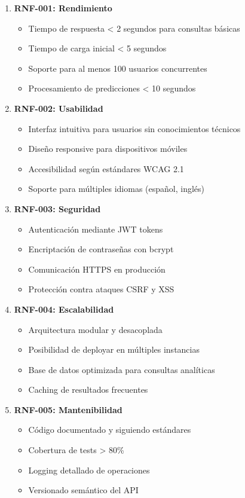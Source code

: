 \begin{enumerate}
    \item \textbf{RNF-001: Rendimiento}
    \begin{itemize}
        \item Tiempo de respuesta < 2 segundos para consultas básicas
        \item Tiempo de carga inicial < 5 segundos
        \item Soporte para al menos 100 usuarios concurrentes
        \item Procesamiento de predicciones < 10 segundos
    \end{itemize}
    
    \item \textbf{RNF-002: Usabilidad}
    \begin{itemize}
        \item Interfaz intuitiva para usuarios sin conocimientos técnicos
        \item Diseño responsive para dispositivos móviles
        \item Accesibilidad según estándares WCAG 2.1
        \item Soporte para múltiples idiomas (español, inglés)
    \end{itemize}
    
    \item \textbf{RNF-003: Seguridad}
    \begin{itemize}
        \item Autenticación mediante JWT tokens
        \item Encriptación de contraseñas con bcrypt
        \item Comunicación HTTPS en producción
        \item Protección contra ataques CSRF y XSS
    \end{itemize}
    
    \item \textbf{RNF-004: Escalabilidad}
    \begin{itemize}
        \item Arquitectura modular y desacoplada
        \item Posibilidad de deployar en múltiples instancias
        \item Base de datos optimizada para consultas analíticas
        \item Caching de resultados frecuentes
    \end{itemize}
    
    \item \textbf{RNF-005: Mantenibilidad}
    \begin{itemize}
        \item Código documentado y siguiendo estándares
        \item Cobertura de tests > 80\%
        \item Logging detallado de operaciones
        \item Versionado semántico del API
    \end{itemize}
    

\end{enumerate}
